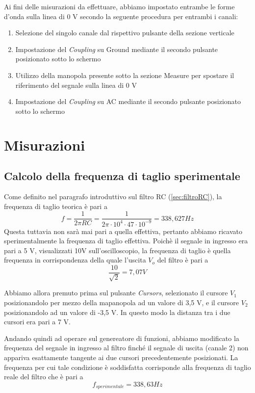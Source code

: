 \begin{itemize}
    Ai fini delle misurazioni da effettuare, abbiamo impostato entrambe le forme d'onda sulla linea di 0 V secondo la seguente procedura per entrambi i canali:
    \begin{enumerate}
        \item Selezione del singolo canale dal rispettivo pulsante della sezione verticale
        \item Impostazione del \emph{Coupling} su Ground mediante il secondo pulsante posizionato sotto lo schermo
        \item Utilizzo della manopola presente sotto la sezione Measure per spostare il riferimento del segnale sulla linea di 0 V
        \item Impostazione del \emph{Coupling} su AC mediante il secondo pulsante posizionato sotto lo schermo  
    \end{enumerate}
\end{itemize}

\clearpage

\section{Misurazioni}

\subsection{Calcolo della frequenza di taglio sperimentale}
Come definito nel paragrafo introduttivo sul filtro RC (\ref{sec:filtroRC}), la frequenza di taglio teorica è pari a
\[f=\frac{1}{2\pi RC}= \frac{1}{2\pi \cdot10^4 \cdot 47 \cdot10^{-9}} = 338,627 Hz\]
Questa tuttavia non sarà mai pari a quella effettiva, pertanto abbiamo ricavato sperimentalmente la frequenza di taglio effettiva. Poichè il segnale in ingresso era pari a 5 V, visualizzati 10V sull'oscilloscopio, la frequenza di taglio è quella frequenza in corrispondenza della quale l'uscita $V_{o}$ del filtro è pari a 
\[\frac{10}{\sqrt{2}} = 7,07 V\]

Abbiamo allora premuto prima sul pulsante \emph{Cursors}, selezionato il cursore $V_1$ posizionandolo per mezzo della mapanopola ad un valore di 3,5 V, 
e il cursore $V_2$ posizionandolo ad un valore di -3,5 V. In questo modo la distanza tra i due cursori era pari a 7 V.

Andando quindi ad operare sul genereatore di funzioni, abbiamo modificato la frequenza del segnale in ingresso al filtro finché il segnale di uscita (canale 2) non appariva esattamente tangente ai due cursori precedentemente posizionati.
La frequenza per cui tale condizione è soddisfatta corrisponde alla frequenza di taglio reale del filtro che è pari a 
\[f_{sperimentale} = 338,63Hz\]


